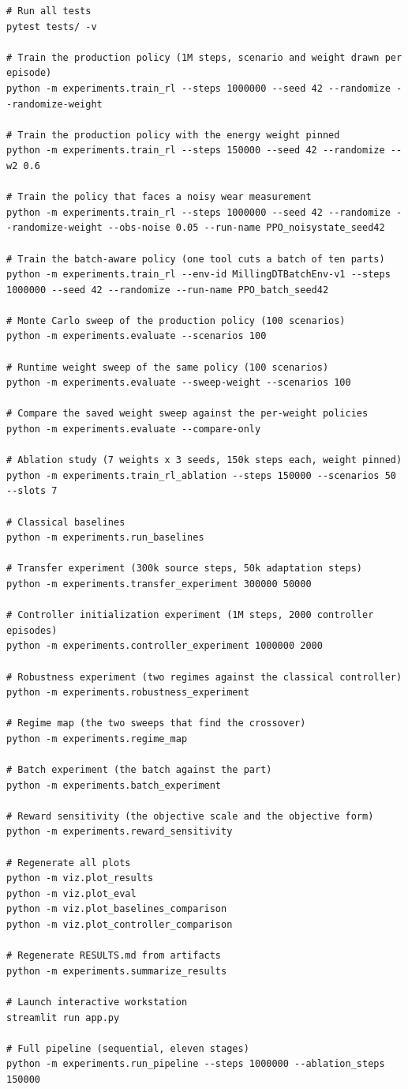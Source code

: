 \documentclass[11pt,a4paper]{article}
\begin{document}
\begin{lstlisting}[style=bash, caption=Key reproducibility commands]
# Run all tests
pytest tests/ -v

# Train the production policy (1M steps, scenario and weight drawn per episode)
python -m experiments.train_rl --steps 1000000 --seed 42 --randomize --randomize-weight

# Train the production policy with the energy weight pinned
python -m experiments.train_rl --steps 150000 --seed 42 --randomize --w2 0.6

# Train the policy that faces a noisy wear measurement
python -m experiments.train_rl --steps 1000000 --seed 42 --randomize --randomize-weight --obs-noise 0.05 --run-name PPO_noisystate_seed42

# Train the batch-aware policy (one tool cuts a batch of ten parts)
python -m experiments.train_rl --env-id MillingDTBatchEnv-v1 --steps 1000000 --seed 42 --randomize --run-name PPO_batch_seed42

# Monte Carlo sweep of the production policy (100 scenarios)
python -m experiments.evaluate --scenarios 100

# Runtime weight sweep of the same policy (100 scenarios)
python -m experiments.evaluate --sweep-weight --scenarios 100

# Compare the saved weight sweep against the per-weight policies
python -m experiments.evaluate --compare-only

# Ablation study (7 weights x 3 seeds, 150k steps each, weight pinned)
python -m experiments.train_rl_ablation --steps 150000 --scenarios 50 --slots 7

# Classical baselines
python -m experiments.run_baselines

# Transfer experiment (300k source steps, 50k adaptation steps)
python -m experiments.transfer_experiment 300000 50000

# Controller initialization experiment (1M steps, 2000 controller episodes)
python -m experiments.controller_experiment 1000000 2000

# Robustness experiment (two regimes against the classical controller)
python -m experiments.robustness_experiment

# Regime map (the two sweeps that find the crossover)
python -m experiments.regime_map

# Batch experiment (the batch against the part)
python -m experiments.batch_experiment

# Reward sensitivity (the objective scale and the objective form)
python -m experiments.reward_sensitivity

# Regenerate all plots
python -m viz.plot_results
python -m viz.plot_eval
python -m viz.plot_baselines_comparison
python -m viz.plot_controller_comparison

# Regenerate RESULTS.md from artifacts
python -m experiments.summarize_results

# Launch interactive workstation
streamlit run app.py

# Full pipeline (sequential, eleven stages)
python -m experiments.run_pipeline --steps 1000000 --ablation_steps 150000
\end{lstlisting}
\end{document}
